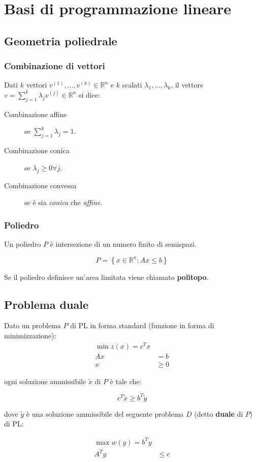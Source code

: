 \documentclass[\main/main.tex]{subfiles}
\begin{document}
\chapter{Basi di programmazione lineare}

\section{Geometria poliedrale}

\subsection{Combinazione di vettori}
Dati $k$ vettori $v^{(1)},\ldots,v^{(k)} \in \mathbb{R}^n$ e $k$ scalati $\lambda_1,\ldots,\lambda_k$, il vettore $v = \sum_{j=1}^k \lambda_j v^{(j)} \in \mathbb{R}^n$ si dice:

\begin{description}
  \item[Combinazione affine] se $\sum_{j=1}^k \lambda_j = 1$.
  \item[Combinazione conica] se $\lambda_j \geq 0 \forall j$.
  \item[Combinazione convessa] se è sia \textit{conica} che \textit{affine}.
\end{description}

\subsection{Poliedro}
Un poliedro $P$ è intersezione di un numero finito di semispazi.

\[
  P = \left\{ x \in \mathbb{R}^n: Ax \leq b \right\}
\]

Se il poliedro definisce un'area limitata viene chiamato \textbf{politopo}.

\section{Problema duale}
\begin{theorem}
  Dato un problema $P$ di PL in forma standard (funzione in forma di minimizzazione):
  \begin{align*}
    \min z(x) = c^T x \\
    Ax & = b          \\
    x  & \geq 0
  \end{align*}

  ogni soluzione ammissibile $\tilde{x}$ di $P$ è tale che:

  \[
    c^T\tilde{x} \geq b^T \tilde{y}
  \]

  dove $\tilde{y}$ è una soluzione ammissibile del seguente problema $D$ (detto \textbf{duale} di $P$) di PL:

  \begin{align*}
    \max w(y) = b^T y \\
    A^Ty & \leq c
  \end{align*}
\end{theorem}
\end{document}
